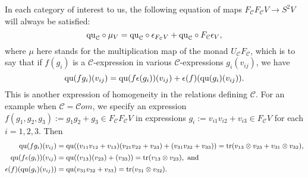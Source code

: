 \documentclass[11pt]{amsart}
\theoremstyle{plain}
\theoremstyle{definition}
\DeclareMathOperator{\trace}{tr}
\renewcommand{\to}{\longrightarrow}
\newcommand{\scrC}{\mathscr{C}}
\newcommand{\calC}{\mathcal{C}}
\newcommand{\calc}{\mathcal{C}}
\theoremstyle{plain}
\newcommand{\quadratic}{\textup{qu}}
\newcommand{\algs}{\scrC\!\textit{om}}
\begin{document}
\begin{CPiAlgs and CHalgs}
In each category of interest to us, the following equation of maps $F_\calC F_\calC V\to S^2 V$ will always be satisfied:
\[\quadratic_\calC\circ\mu_V=\quadratic_\calC\circ \epsilon_{F_\calC V} +\quadratic_\calC\circ {F_\calC \epsilon_V},\]
where $\mu$ here stands for the multiplication map of the monad $U_\calC F_\calC $, which is to say that if  $f(g_i)$ is a $\calC$-expression in various $\calC$-expressions $g_i(v_{ij})$, we have 
\[\quadratic(fg_i)(v_{ij})=\quadratic(f\epsilon(g_i))(v_{ij})+\epsilon(f)(\quadratic(g_i)(v_{ij})).\]
This is another expression of homogeneity in the relations defining $\calC$. For an example when $\calC=\algs$, we specify an expression $f(g_1,g_2,g_3):=g_1g_2+g_3\in F_{\calc}F_{\calc}V$ in expressions $g_i:=v_{i1}v_{i2}+v_{i3}\in F_{\calc}V$ for each $i=1,2,3$. Then
\begin{alignat*}{2}
\textup{\small$\quadratic(fg_i)(v_{ij})={}$}
&
\textup{\small$\quadratic((v_{11}v_{12}+v_{13})(v_{21}v_{22}+v_{23})+(v_{31}v_{32}+v_{33}))=\trace(v_{13}\otimes v_{23}+v_{31}\otimes v_{32}),$}
\\
\textup{\small$\quadratic(f\epsilon(g_i))(v_{ij})={}$}
&
\textup{\small$\quadratic((v_{13})(v_{23})+(v_{33}))=\trace(v_{13}\otimes v_{23}),\textup{ and}$}
\\
\textup{\small$\epsilon(f)(\quadratic(g_i)(v_{ij}))={}$}
&
\textup{\small$\quadratic(v_{31}v_{32}+v_{33})=\trace(v_{31}\otimes v_{32}).$}
\end{alignat*}










\end{CPiAlgs and CHalgs}
\end{document}
